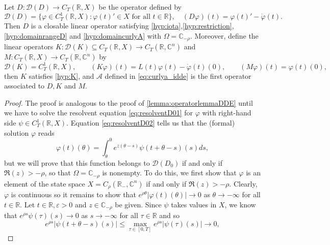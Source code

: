 \documentclass[english]{myarticle}
\begin{document}
\begin{sloppypar}
\begin{lemma}
Let $D : \mathcal{D}(D) \to C_T(\mathbb{R},X)$ be the operator defined by
\begin{equation*}
    \mathcal{D}(D) = \{ \varphi \in C_T^1(\mathbb{R},X) : \varphi(t)' \in X \mbox{ for all $t \in \mathbb{R}$} \}, \quad (D\varphi)(t) = \varphi(t)' - \dot{\varphi}(t).
\end{equation*}
Then $D$ is a closable linear operator satisfying \ref{hyp:iota},\ref{hyp:restriction}, \ref{hyp:domainrangeD} and \ref{hyp:domaincurlyA} with $\Omega = \mathbb{C}_{-\rho}$. Moreover, define the linear operators $K : \mathcal{D}(K) \subseteq C_T(\mathbb{R},X) \to C_T(\mathbb{R},\mathbb{C}^n)$ and $M : C_T(\mathbb{R},X) \to C_T(\mathbb{R},\mathbb{C}^n)$ by
\begin{equation*}
    \mathcal{D}(K) = C_T^1(\mathbb{R},X), \qquad (K\varphi)(t) = L(t) \varphi(t) - \dot{\varphi}(t)(0), \qquad (M\varphi)(t) = \varphi(t)(0), 
\end{equation*}
then $K$ satisfies \ref{hyp:K}, and $\mathcal{A}$ defined in \eqref{eq:curlya_idde} is the first operator associated to $D, K$ and $M$.  
\end{lemma}
\begin{proof}
The proof is analogous to the proof of \cref{lemma:operatorlemmaDDE} until we have to solve the resolvent equation \eqref{eq:resolventD01} for $\varphi$ with right-hand side $\psi \in C_T^1(\mathbb{R},X)$. Equation \eqref{eq:resolventD02} tells us that the (formal) solution $\varphi$ reads
\begin{equation*}
\varphi(t)(\theta) = \int_\theta^0 e^{z(\theta - s)} \psi(t+\theta -s)(s) ds, 
\end{equation*}
but we will prove that this function belongs to $\mathcal{D}(D_0)$ if and only if $\Re(z) > -\rho$, so that $\Omega = \mathbb{C}_{-\rho}$ is nonempty. To do this, we first show that $\varphi$ is an element of the state space $X = C_\rho(\mathbb{R}_-, \mathbb{C}^n)$ if and only if $\Re(z) > -\rho$. Clearly, $\varphi$ is continuous so it remains to show that $e^{\rho \theta}|\varphi(t)(\theta)| \to 0$ as $\theta \to -\infty$ for all $t \in \mathbb{R}$. Let $t \in \mathbb{R}, \varepsilon > 0$ and $z \in \mathbb{C}_{-\rho}$ be given. Since $\psi$ takes values in $X$, we know that $e^{\rho s}\psi(\tau)(s) \to 0$ as $s \to -\infty$ for all $\tau \in \mathbb{R}$ and so
\begin{equation*}
e^{\rho s} | \psi(t+\theta-s)(s)| \leq \max_{\tau \in [0,T]} e^{\rho s} |\psi(\tau)(s)| \to 0,
\end{equation*}

\end{proof}
\end{sloppypar}
\end{document}
